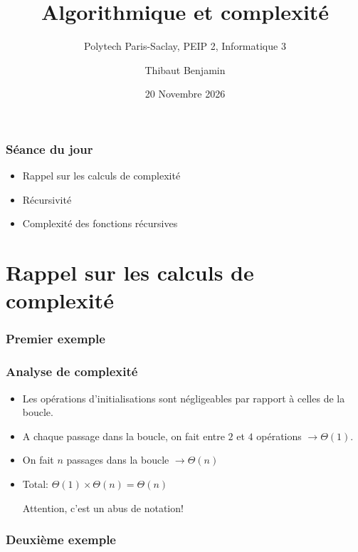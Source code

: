\documentclass[aspectratio=169]{beamer}
\title{Algorithmique et complexité}
\subtitle{Polytech Paris-Saclay, PEIP 2, Informatique 3}
\author{Thibaut Benjamin}
\date{20 Novembre 2026}
\institute{Amphi 3}
\begin{document}
\maketitle

\begin{frame}
  \frametitle{Séance du jour}

  \begin{itemize}
  \item Rappel sur les calculs de complexité
  \item Récursivité
  \item Complexité des fonctions récursives
  \end{itemize}

\end{frame}

\section{Rappel sur les calculs de complexité}

\begin{frame}[fragile]
  \frametitle{Premier exemple}

\end{frame}

\begin{frame}
  \frametitle{Analyse de complexité}
  \begin{itemize}
  \item<+-> Les opérations d'initialisations sont négligeables par rapport à
    celles de la boucle.

  \item<+-> A chaque passage dans la boucle, on fait entre \(2\) et \(4\)
    opérations \(\to \Theta(1)\).

  \item<+-> On fait \(n\) passages dans la boucle \(\to \Theta(n)\)

  \item<+-> Total: \(\Theta(1)\times \Theta(n) = \Theta(n)\)

    \alert{Attention, c'est un abus de notation!}
  \end{itemize}
\end{frame}

\begin{frame}[fragile]
  \frametitle{Deuxième exemple}

\end{frame}
\end{document}
